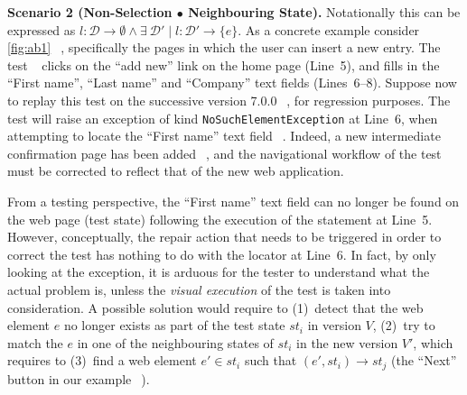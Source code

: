 
\noindent
\textbf{Scenario 2 (Non-Selection $\bullet$ Neighbouring State).}
Notationally this can be expressed as $l: \mathcal{D} \rightarrow \emptyset \land \exists \ \mathcal{D'} \mid l: \mathcal{D'} \rightarrow \{e\}$.
As a concrete example consider \autoref{fig:ab1}~\textcircled{}, %
specifically the pages in which the user can insert a new entry. The test~\textcircled{} clicks on the ``add new'' link on the home page (Line~5), and fills in the ``First name'', ``Last name'' and ``Company'' text fields (Lines~6--8).
Suppose now to replay this test on the successive version 7.0.0~\textcircled{}, for regression purposes. The test will raise an exception of kind \texttt{NoSuchElementException} at Line~6, when attempting to locate the ``First name'' text field~\textcircled{}. 
Indeed, a new intermediate confirmation page has been added~\textcircled{}, and the navigational workflow of the test must be corrected to reflect that of the new  web application.

From a testing perspective, the ``First name'' text field can no longer be found on the web page (test state) following the execution of the statement at Line~5. However, conceptually, the repair action that needs to be triggered in order to correct the test has nothing to do with the locator at Line~6.
In fact, by only looking at the exception, it is arduous for the tester to understand what the actual problem is, unless the \textit{visual execution} of the test is taken into consideration.
%
%
A possible solution would require to (1)~detect that the web element $e$ no longer exists as part of the test state $st_i$ in version $V$, (2)~try to match the $e$ in one of the neighbouring states of $st_i$ in the new version $V'$, which requires to (3)~find  a web element $e' \in st_i$ such that $(e', st_i) \rightarrow st_j$ (the ``Next'' button in our example~\textcircled{}).

